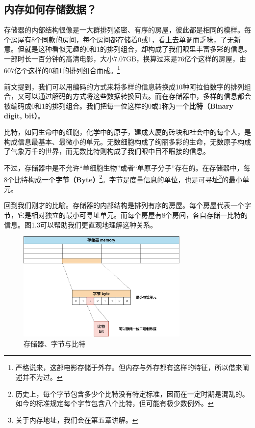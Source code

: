 \subsection*{内存如何存储数据？}
存储器的内部结构很像是一大群排列紧密、有序的房屋，彼此都是相同的模样。每个房屋有8个同款的房间，每个房间都存储着0或1，看上去单调而乏味，了无新意。但就是这种看似无趣的0和1的排列组合，却构成了我们眼里丰富多彩的信息。一部时长一百分钟的高清电影，大小7.07GB，换算过来是76亿个这样的房屋，由607亿个这样的0和1的排列组合而成。\footnote{严格说来，这部电影存储于外存。但内存与外存都有这样的特征，所以借来阐述并不为过。}\par
前文提到，我们可以用编码的方式来将多样的信息转换成10种阿拉伯数字的排列组合，又可以通过解码的方式将这些数据转换回去。而在存储器中，多样的信息都会被编码成0和1的排列组合。我们把每一位这样的0或1称为一个\textbf{比特（Binary digit, bit）}。\par
比特，如同生命中的细胞，化学中的原子，建成大厦的砖块和社会中的每个人，是构成信息最基本、最微小的单元。无数细胞构成了绚丽多彩的生命，无数原子构成了气象万千的世界，而无数比特则构成了我们眼中目不睱接的信息。\par
不过，存储器中是不允许``单细胞生物''或者``单原子分子''存在的。在存储器中，每8个比特构成一个\textbf{字节（Byte）}\footnote{历史上，每个字节包含多少个比特没有特定标准，因而在一定时期是混乱的。如今的标准规定每个字节包含八个比特，但可能有极少数例外。}。字节是度量信息的单位，也是可寻址\footnote{关于内存地址，我们会在第五章讲解。}的最小单元。\par
回到我们刚才的比喻。存储器的内部结构是排列有序的房屋。每个房屋代表一个字节，它是相对独立的最小可寻址单元。而每个房屋有8个房间，各自存储一比特的信息。图1.3可以帮助我们更直观地理解这种关系。\par
\begin{figure}[htbp]
    \centering
    \includegraphics[width=0.75\textwidth]{../images/generalized_parts/01_Memory_byte_and_bit.png}
    \caption{存储器、字节与比特}
\end{figure}
